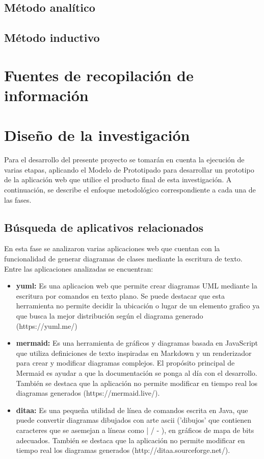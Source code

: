 \subsection{Método analítico}

\subsection{Método inductivo}

\section{Fuentes de recopilación de información}

\section{Diseño de la investigación}

Para el desarrollo del presente proyecto se tomarán en cuenta la ejecución de varias etapas, aplicando el Modelo de Prototipado para desarrollar un prototipo de la aplicación web que utilice el producto final de esta investigación. A continuación, se describe el enfoque metodológico correspondiente a cada una de las fases. 

\subsection{Búsqueda de aplicativos relacionados}

En esta fase se analizaron varias aplicaciones web que cuentan con la funcionalidad de generar diagramas de clases mediante la escritura de texto. Entre las aplicaciones analizadas se encuentran:

\begin{itemize}
	\item \textbf{yuml: }Es una aplicacion web que permite crear diagramas UML mediante la escritura por comandos en texto plano. Se puede destacar que esta herramienta no permite decidir la ubicación o lugar de un elemento grafico ya que busca la mejor distribución según el diagrama generado (https://yuml.me/)
	
	\item \textbf{mermaid: }Es una herramienta de gráficos y diagramas basada en JavaScript que utiliza definiciones de texto inspiradas en Markdown y un renderizador para crear y modificar diagramas complejos. El propósito principal de Mermaid es ayudar a que la documentación se ponga al día con el desarrollo. También se destaca que la aplicación no permite modificar en tiempo real los diagramas generados (https://mermaid.live/).
	
	\item \textbf{ditaa: }Es una pequeña utilidad de línea de comandos escrita en Java, que puede convertir diagramas dibujados con arte ascii ('dibujos' que contienen caracteres que se asemejan a líneas como | / - ), en gráficos de mapa de bits adecuados. También se destaca que la aplicación no permite modificar en tiempo real los diagramas generados (http://ditaa.sourceforge.net/). 
\end{itemize}

